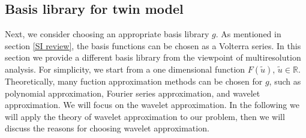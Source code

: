 \documentclass[a4paper,onecolumn]{article}
\theoremstyle{remark}
\begin{document}
\subsection{Basis library for twin model}
\label{basis selection}
\noindent Next, we consider choosing an appropriate basis library $g$.
As mentioned in section \ref{SI review}, the basis functions can be chosen
as a Volterra series. In this section we provide a different basis library
from the viewpoint of multiresolution analysis.
For simplicity, we start from a one dimensional function $F(\tilde{u})$, 
$\tilde{u}\in \mathbb{R}$.
Theoretically, many fuction approximation methods can be chosen for $g$, such as polynomial 
approximation, Fourier series approximation, and wavelet approximation. 
We will focus on the wavelet approximation. In the following we will apply the theory 
of wavelet approximation to our problem, then we will discuss the reasons for choosing 
wavelet approximation.\\
\end{document}
